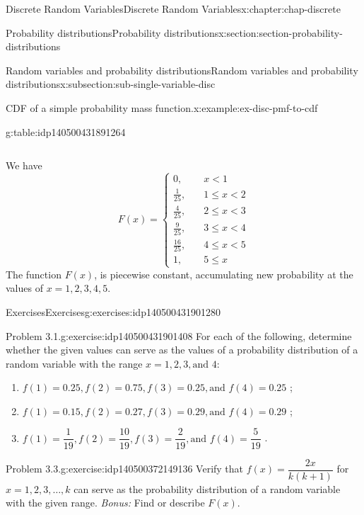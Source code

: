 \documentclass[oneside,10pt,]{book}
\newcommand{\lt}{<}
\newcommand{\amp}{&}
\begin{document}
\begin{chapterptx}{Discrete Random Variables}{}{Discrete Random Variables}{}{}{x:chapter:chap-discrete}
\begin{sectionptx}{Probability distributions}{}{Probability distributions}{}{}{x:section:section-probability-distributions}
\begin{subsectionptx}{Random variables and probability distributions}{}{Random variables and probability distributions}{}{}{x:subsection:sub-single-variable-disc}
\begin{example}{CDF of a simple probability mass function.}{x:example:ex-disc-pmf-to-cdf}
\begin{tableptx}{\textbf{}}{g:table:idp140500431891264}{}
{\begin{tabular}{lll}
\end{tabular}
}%
\end{tableptx}%
 We have%
\begin{equation*}
F(x) = \begin{cases} 0, \amp \quad x \lt 1\\
\frac{1}{25}, \amp \quad 1 \le x \lt 2\\
\frac{4}{25}, \amp \quad 2 \le x \lt 3\\
\frac{9}{25}, \amp \quad 3 \le x \lt 4\\
\frac{16}{25}, \amp \quad 4 \le x \lt 5\\
1, \amp \quad 5 \le x
\end{cases}
\end{equation*}
The function \(F(x)\), is piecewise constant, accumulating new probability at the values of \(x = 1, 2, 3, 4, 5\).%
\end{example}
\end{subsectionptx}
%
%
\typeout{************************************************}
\typeout{************************************************}
%
\begin{exercises-subsection}{Exercises}{}{Exercises}{}{}{g:exercises:idp140500431901280}
\begin{divisionexercise}{1}{Problem 3.1.}{}{g:exercise:idp140500431901408}%
For each of the following, determine whether the given values can serve as the values of a probability distribution of a random variable with the range \(x = 1, 2, 3, \text{and } 4\):%
\begin{enumerate}[label=(\alph*)]
\item{}\(\displaystyle f(1) = 0.25,f(2) = 0.75,f(3) = 0.25, \text{and } f(4) =
0.25\)%
; \item{}\(\displaystyle f(1) = 0.15,f(2) = 0.27,f(3) = 0.29, \text{and } f(4) =
0.29\)%
; \item{}\(\displaystyle f(1) = \dfrac{1}{19},f(2) = \dfrac{10}{19},f(3) =
\dfrac{2}{19}, \text{and } f(4) = \dfrac{5}{19}\)%
.\end{enumerate}
%
\end{divisionexercise}%
\begin{divisionexercise}{2}{Problem 3.3.}{}{g:exercise:idp140500372149136}%
Verify that \(\displaystyle f(x) = \dfrac{2x}{k(k+1)}\) for \(x=1, 2,
3, \dots, k\) can serve as the probability distribution of a random variable with the given range. \emph{Bonus:} Find or describe \(F(x)\).\textbraceright{}%
\end{divisionexercise}%

\end{exercises-subsection}
\end{sectionptx}
\end{chapterptx}
\end{document}
